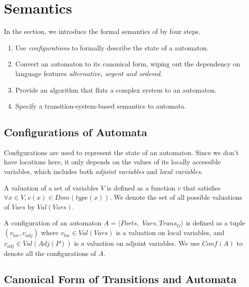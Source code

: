\section{Semantics}
\label{sec:semantics}

In the section, we introduce the formal semantics of \lang{} by four steps.
\begin{enumerate}
    \item Use \emph{configurations} to formally describe the state of a automaton.
    \item Convert an automaton to its canonical form, wiping out the dependency on language features \emph{alternative, urgent and ordered}.
    \item Provide an algorithm that flats a complex system to an automaton.
    \item Specify a transition-system-based semantics to \lang{} automata.
\end{enumerate}


\subsection{Configurations of Automata}
\label{subsec:config}
Configurations are used to represent the state of an automaton. Since we don't have locations here, it only depends on the values of its locally accessible variables, which includes both \emph{adjoint variables} and \emph{local variables}.

\begin{definition}[Valuation]
A valuation of a set of variables $V$ is defined as a function $v$ that satisfies $\forall x\in V,v(x)\in Dom(type(x))$. We denote the set of all possible valuations of $Vars$ by $Val(Vars)$.
\end{definition}

\begin{definition}[Configuration] A configuration of an automaton $A=\langle Ports,$ $Vars,Trans_G\rangle$ is defined as a tuple $(v_{loc},v_{adj})$ where $v_{loc}\in Val(Vars)$ is a valuation on local variables, and $v_{adj}\in Val(Adj(P))$ is a valuation on adjoint variables. We use $Conf(A)$ to denote all the configurations of $A$.
\end{definition}

\subsection{Canonical Form of Transitions and Automata}
\label{subsec:canonical}

